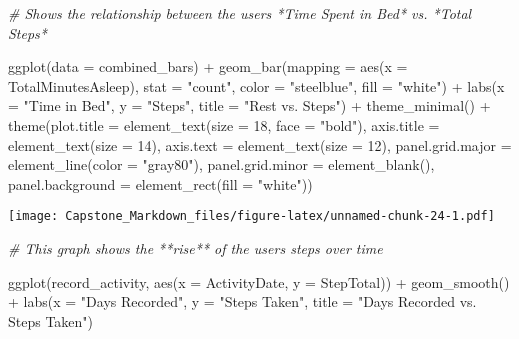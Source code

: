 \documentclass[
]{article}
\newenvironment{Shaded}{\begin{snugshade}}{\end{snugshade}}
\newcommand{\AttributeTok}[1]{\textcolor[rgb]{0.77,0.63,0.00}{#1}}
\newcommand{\CommentTok}[1]{\textcolor[rgb]{0.56,0.35,0.01}{\textit{#1}}}
\newcommand{\DecValTok}[1]{\textcolor[rgb]{0.00,0.00,0.81}{#1}}
\newcommand{\FunctionTok}[1]{\textcolor[rgb]{0.00,0.00,0.00}{#1}}
\newcommand{\NormalTok}[1]{#1}
\newcommand{\SpecialCharTok}[1]{\textcolor[rgb]{0.00,0.00,0.00}{#1}}
\newcommand{\StringTok}[1]{\textcolor[rgb]{0.31,0.60,0.02}{#1}}
\begin{document}
\begin{Shaded}
\begin{Highlighting}[]
\CommentTok{\# Shows the relationship between the users *Time Spent in Bed* vs. *Total Steps* }

\FunctionTok{ggplot}\NormalTok{(}\AttributeTok{data =}\NormalTok{ combined\_bars) }\SpecialCharTok{+}
  \FunctionTok{geom\_bar}\NormalTok{(}\AttributeTok{mapping =} \FunctionTok{aes}\NormalTok{(}\AttributeTok{x =}\NormalTok{ TotalMinutesAsleep), }\AttributeTok{stat =} \StringTok{"count"}\NormalTok{, }\AttributeTok{color =} \StringTok{"steelblue"}\NormalTok{, }\AttributeTok{fill =} \StringTok{"white"}\NormalTok{) }\SpecialCharTok{+}
  \FunctionTok{labs}\NormalTok{(}\AttributeTok{x =} \StringTok{"Time in Bed"}\NormalTok{, }\AttributeTok{y =} \StringTok{"Steps"}\NormalTok{, }\AttributeTok{title =} \StringTok{"Rest vs. Steps"}\NormalTok{) }\SpecialCharTok{+}
  \FunctionTok{theme\_minimal}\NormalTok{() }\SpecialCharTok{+}
  \FunctionTok{theme}\NormalTok{(}\AttributeTok{plot.title =} \FunctionTok{element\_text}\NormalTok{(}\AttributeTok{size =} \DecValTok{18}\NormalTok{, }\AttributeTok{face =} \StringTok{"bold"}\NormalTok{),}
        \AttributeTok{axis.title =} \FunctionTok{element\_text}\NormalTok{(}\AttributeTok{size =} \DecValTok{14}\NormalTok{),}
        \AttributeTok{axis.text =} \FunctionTok{element\_text}\NormalTok{(}\AttributeTok{size =} \DecValTok{12}\NormalTok{),}
        \AttributeTok{panel.grid.major =} \FunctionTok{element\_line}\NormalTok{(}\AttributeTok{color =} \StringTok{"gray80"}\NormalTok{),}
        \AttributeTok{panel.grid.minor =} \FunctionTok{element\_blank}\NormalTok{(),}
        \AttributeTok{panel.background =} \FunctionTok{element\_rect}\NormalTok{(}\AttributeTok{fill =} \StringTok{"white"}\NormalTok{))}
\end{Highlighting}
\end{Shaded}

\texttt{[image: Capstone\_Markdown\_files/figure-latex/unnamed-chunk-24-1.pdf]}

\begin{Shaded}
\begin{Highlighting}[]
\CommentTok{\# This graph shows the **rise** of the users steps over time }

\FunctionTok{ggplot}\NormalTok{(record\_activity, }\FunctionTok{aes}\NormalTok{(}\AttributeTok{x =}\NormalTok{ ActivityDate, }\AttributeTok{y =}\NormalTok{ StepTotal)) }\SpecialCharTok{+}
  \FunctionTok{geom\_smooth}\NormalTok{() }\SpecialCharTok{+}
  \FunctionTok{labs}\NormalTok{(}\AttributeTok{x =} \StringTok{"Days Recorded"}\NormalTok{, }\AttributeTok{y =} \StringTok{"Steps Taken"}\NormalTok{, }\AttributeTok{title =} \StringTok{"Days Recorded vs. Steps Taken"}\NormalTok{)}
\end{Highlighting}
\end{Shaded}
\end{document}
